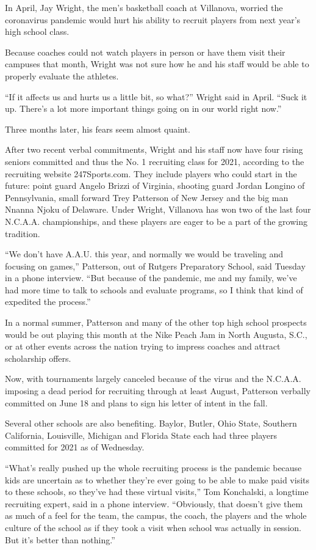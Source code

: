 In April, Jay Wright, the men's basketball coach at Villanova, worried
the coronavirus pandemic would hurt his ability to recruit players from
next year's high school class.

Because coaches could not watch players in person or have them visit
their campuses that month, Wright was not sure how he and his staff
would be able to properly evaluate the athletes.

``If it affects us and hurts us a little bit, so what?'' Wright said in
April. ``Suck it up. There's a lot more important things going on in our
world right now.''

Three months later, his fears seem almost quaint.

After two recent verbal commitments, Wright and his staff now have four
rising seniors committed and thus the No. 1 recruiting class for 2021,
according to the recruiting website 247Sports.com. They include players
who could start in the future: point guard Angelo Brizzi of Virginia,
shooting guard Jordan Longino of Pennsylvania, small forward Trey
Patterson of New Jersey and the big man Nnanna Njoku of Delaware. Under
Wright, Villanova has won two of the last four N.C.A.A. championships,
and these players are eager to be a part of the growing tradition.

``We don't have A.A.U. this year, and normally we would be traveling and
focusing on games,'' Patterson, out of Rutgers Preparatory School, said
Tuesday in a phone interview. ``But because of the pandemic, me and my
family, we've had more time to talk to schools and evaluate programs, so
I think that kind of expedited the process.''

In a normal summer, Patterson and many of the other top high school
prospects would be out playing this month at the Nike Peach Jam in North
Augusta, S.C., or at other events across the nation trying to impress
coaches and attract scholarship offers.

Now, with tournaments largely canceled because of the virus and the
N.C.A.A. imposing a dead period for recruiting through at least August,
Patterson verbally committed on June 18 and plans to sign his letter of
intent in the fall.

Several other schools are also benefiting. Baylor, Butler, Ohio State,
Southern California, Louisville, Michigan and Florida State each had
three players committed for 2021 as of Wednesday.

``What's really pushed up the whole recruiting process is the pandemic
because kids are uncertain as to whether they're ever going to be able
to make paid visits to these schools, so they've had these virtual
visits,'' Tom Konchalski, a longtime recruiting expert, said in a phone
interview. ``Obviously, that doesn't give them as much of a feel for the
team, the campus, the coach, the players and the whole culture of the
school as if they took a visit when school was actually in session. But
it's better than nothing.''

